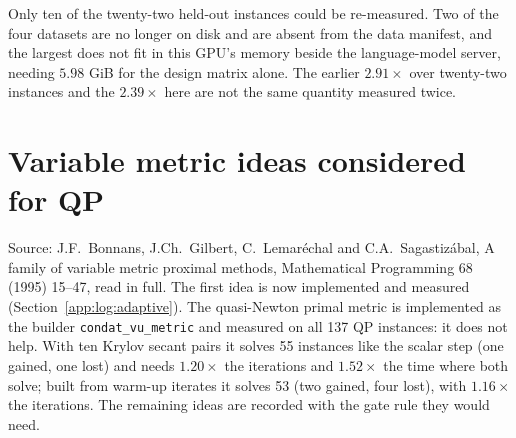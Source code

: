 \documentclass[11pt]{article}
\begin{document}
Only ten of the twenty-two held-out instances could be re-measured. Two of the four
datasets are no longer on disk and are absent from the data manifest, and the largest
does not fit in this GPU's memory beside the language-model server, needing
$5.98$ GiB for the design matrix alone. The earlier $2.91\times$ over twenty-two
instances and the $2.39\times$ here are not the same quantity measured twice.

\section{Variable metric ideas considered for QP}
\label{app:log:varmetric}

Source: J.F.~Bonnans, J.Ch.~Gilbert, C.~Lemar\'echal and C.A.~Sagastiz\'abal, A
family of variable metric proximal methods, Mathematical Programming 68
(1995) 15--47, read in full. The first idea is now implemented and measured
(Section~\ref{app:log:adaptive}). The quasi-Newton primal metric is implemented as
the builder \texttt{condat\_vu\_metric} and measured on all 137 QP instances: it does not
help. With ten Krylov secant pairs it solves 55 instances like the scalar step (one
gained, one lost) and needs $1.20\times$ the iterations and $1.52\times$ the time where
both solve; built from warm-up iterates it solves 53 (two gained, four lost), with
$1.16\times$ the iterations. The remaining ideas are recorded with the gate rule they
would need.
\end{document}
